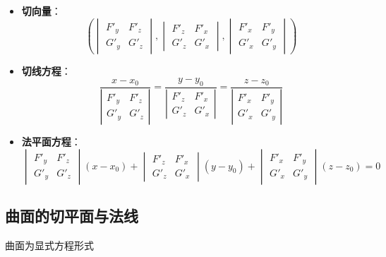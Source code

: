 \documentclass[12pt]{book}
\newcommand{\hei}{\CJKfamily{hei}}      %
\theoremstyle{mythm}
\begin{document}
\begin{itemize}
    \item \textbf{切向量}：
    \[
    \left(
    \begin{vmatrix}
    F'_y & F'_z \\
    G'_y & G'_z
    \end{vmatrix},
    \begin{vmatrix}
    F'_z & F'_x \\
    G'_z & G'_x
    \end{vmatrix},
    \begin{vmatrix}
    F'_x & F'_y \\
    G'_x & G'_y
    \end{vmatrix}
    \right)
    \]
    
    \item \textbf{切线方程}：
    \[
    \frac{x - x_0}{\left| \begin{matrix} F'_y & F'_z \\ G'_y & G'_z \end{matrix} \right|} = 
    \frac{y - y_0}{\left| \begin{matrix} F'_z & F'_x \\ G'_z & G'_x \end{matrix} \right|} = 
    \frac{z - z_0}{\left| \begin{matrix} F'_x & F'_y \\ G'_x & G'_y \end{matrix} \right|}
    \]
    
    \item \textbf{法平面方程}：
    \[
    \begin{vmatrix}
    F'_y & F'_z \\
    G'_y & G'_z
    \end{vmatrix} (x - x_0) +
    \begin{vmatrix}
    F'_z & F'_x \\
    G'_z & G'_x
    \end{vmatrix} (y - y_0) +
    \begin{vmatrix}
    F'_x & F'_y \\
    G'_x & G'_y
    \end{vmatrix} (z - z_0) = 0
    \]
\end{itemize}

\subsection{曲面的切平面与法线}

{\hei 曲面为显式方程形式}
\end{document}
